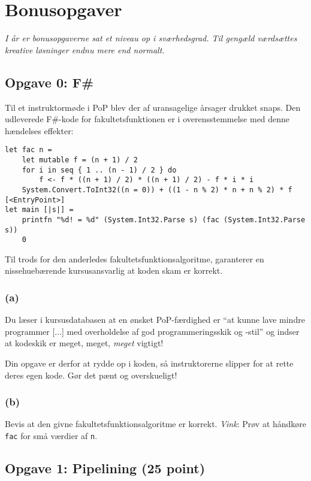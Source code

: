\section{\huge{Bonusopgaver}}

\emph{I år er bonusopgaverne sat et niveau op i sværhedsgrad.  Til gengæld
  værdsættes kreative løsninger endnu mere end normalt.}

\subsection{Opgave 0: F\#}

Til et instruktormøde i PoP blev der af uransagelige årsager drukket snaps.  Den
udleverede F\#-kode for fakultetsfunktionen er i overensstemmelse med denne
hændelses effekter:

\tiny
\begin{verbatim}
let fac n =
    let mutable f = (n + 1) / 2
    for i in seq { 1 .. (n - 1) / 2 } do
        f <- f * ((n + 1) / 2) * ((n + 1) / 2) - f * i * i
    System.Convert.ToInt32((n = 0)) + ((1 - n % 2) * n + n % 2) * f
[<EntryPoint>]
let main [|s|] =
    printfn "%d! = %d" (System.Int32.Parse s) (fac (System.Int32.Parse s))
    0
\end{verbatim}
\normalsize

Til trods for den anderledes fakultetsfunktionsalgoritme, garanterer en
nissehuebærende kursusansvarlig at koden skam er korrekt.

\subsubsection{(a)}

Du læser i kursusdatabasen at en ønsket PoP-færdighed er ``at kunne lave mindre
programmer [...] med overholdelse af god programmeringsskik og -stil'' og indser
at kodeskik er meget, meget, \emph{meget} vigtigt!

Din opgave er derfor at rydde op i koden, så instruktorerne slipper for at rette
deres egen kode.  Gør det pænt og overskueligt!


\subsubsection{(b)}

Bevis at den givne fakultetsfunktionsalgoritme er korrekt.  \emph{Vink}: Prøv at
håndkøre \texttt{fac} for små værdier af \texttt{n}.


\newpage
\subsection{Opgave 1: Pipelining (25 point)}


